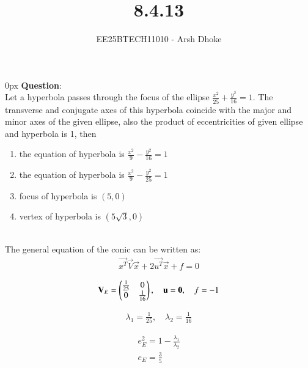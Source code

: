 \documentclass[journal]{IEEEtran}
\begin{document}

\vspace{3cm}

\title{8.4.13}
\author{EE25BTECH11010 - Arsh Dhoke}
{\let\newpage\relax\maketitle}

\renewcommand{\thefigure}{\theenumi}
\renewcommand{\thetable}{\theenumi}
\setlength{\intextsep}{10pt}
\renewcommand{\thetable}{\theenumi}

\parindent 0px
\textbf{Question}:\\
Let a hyperbola passes through the focus of the ellipse 
$
\frac{x^2}{25} + \frac{y^2}{16} = 1.
$
The transverse and conjugate axes of this hyperbola coincide with the major and minor axes of the given ellipse, also the product of eccentricities of given ellipse and hyperbola is 1, then
\begin{multicols}{2}
\begin{enumerate}
    \item the equation of hyperbola is 
    $\frac{x^2}{9} - \frac{y^2}{16} = 1$
    \item the equation of hyperbola is 
    $\frac{x^2}{9} - \frac{y^2}{25} = 1$
    \item focus of hyperbola is $(5, 0)$
    \item vertex of hyperbola is $(5\sqrt{3}, 0)$
\end{enumerate}
\end{multicols}

\solution \\

The general equation of the conic can be written as:
\begin{align}
\vec{x^T}\vec{V}\vec{x} + 2\vec{u^T}\vec{x} + f = 0
\end{align}

\begin{align}
\mathbf{V}_E=\begin{pmatrix}\frac{1}{25}&0\\0&\frac{1}{16}\end{pmatrix}, \quad \mathbf{u}=\mathbf{0}, \quad f=-1
\end{align}

\begin{align}
\lambda_1=\frac{1}{25}, \quad \lambda_2=\frac{1}{16}
\end{align}

\begin{align}
e_E^2 = 1 - \frac{\lambda_1}{\lambda_2}  \\
e_E = \frac{3}{5}
\end{align}
\end{document}
